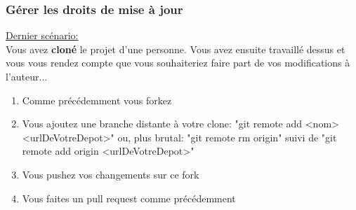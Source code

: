 \documentclass{beamer}
\begin{document}
\begin{frame}
\frametitle{Gérer les droits de mise à jour}

\underline{Dernier scénario:}\\
\smallskip
Vous avez \textbf{cloné} le projet d'une personne. Vous avez ensuite travaillé dessus et vous vous rendez compte que vous souhaiteriez faire part de vos modifications à l'auteur...\\
\medskip

\begin{enumerate}
    \item Comme précédemment vous forkez
    \item Vous ajoutez une branche distante à votre clone: "git remote add <nom> <urlDeVotreDepot>" ou, plus brutal: "git remote rm origin" suivi de "git remote add origin <urlDeVotreDepot>"
    \item Vous pushez vos changements sur ce fork
    \item Vous faites un pull request comme précédemment
\end{enumerate}
\end{frame}
\end{document}

